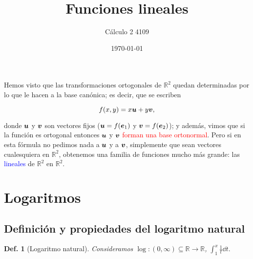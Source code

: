 \documentclass{article}
\title{\Huge{Funciones lineales}}
\author{Cálculo 2 4109}
\date{\today}
\theoremstyle{definicion}
\newtheorem{definicion}{Def.}
\theoremstyle{definition}             %
\theoremstyle{definition}             %
\theoremstyle{definition}
\theoremstyle{definition}
\theoremstyle{observacion}
\theoremstyle{definition}
\theoremstyle{plain}
\theoremstyle{definition}
\theoremstyle{afirmacion}
\theoremstyle{definition}
\begin{document}
    \maketitle

    Hemos visto que las transformaciones ortogonales de \(\mathbb{R}^{2}\) quedan determinadas por lo que le hacen a la base canónica; es decir, que se escriben

    \begin{equation*}
        f(x, y) = x\vb*{u} + y\vb*{v},
    \end{equation*}

    donde \(\vb*{u}\) y \(\vb*{v}\) son vectores fijos (\(\vb*{u} = f(\vb*{e}_{1})\) y \(\vb*{v} = f(\vb*{e}_{2})\)); y además, vimos que si la función es ortogonal entonces \(\vb*{u}\) y \(\vb*{v}\) \textcolor{red}{forman una base ortonormal}. Pero si en esta fórmula no pedimos nada a \(\vb*{u}\) y a \(\vb*{v}\), simplemente que sean vectores cualesquiera en \(\mathbb{R}^{2}\), obtenemos una familia de funciones mucho más grande: las \textcolor{blue}{lineales} de \(\mathbb{R}^{2}\) en \(\mathbb{R}^{2}\).

    \section{Logaritmos}
    \subsection{Definición y propiedades del logaritmo natural}

    \begin{definicion}[Logaritmo natural]   
        Consideramos \(\log \colon (0, \infty) \subseteq \mathbb{R} \to \mathbb{R}\), \(\int_{1}^{x}\frac{1}{t}\dd{t}.\)
    \end{definicion}
\end{document}
